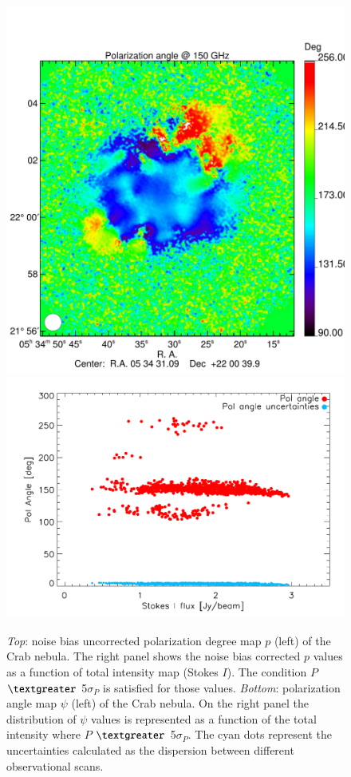 \documentclass[twocolumn,traditabstract]{aa}
\begin{document}
\begin{figure}
\includegraphics[clip, angle=0, scale = 0.35]{figures/Crab_angle2_2mm.pdf}
\includegraphics[clip, angle=0, scale = 0.5]{figures/pol_angle_vs_I_2mm.pdf}
\caption{{\it Top}: noise bias uncorrected polarization degree map $p$ (left) of the Crab nebula. The right panel shows the noise bias corrected $p$ values as a function of total intensity map (Stokes $I$). The condition $P$ $\textgreater$ 5$\sigma_{P}$ is satisfied for those values. {\it Bottom}: polarization angle map $\psi$ (left) of the Crab nebula. On the right panel the distribution of $\psi$ values is represented as a function of the total intensity where $P$ $\textgreater$ 5$\sigma_{P}$. The cyan dots represent the uncertainties calculated as the dispersion between different  observational scans.}
\label{fig:pol_degree}
\end{figure}
\end{document}
